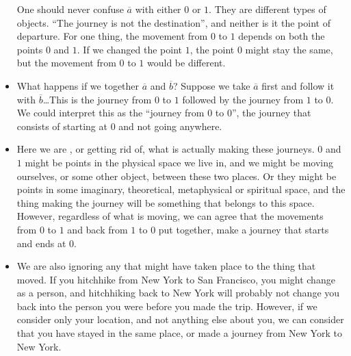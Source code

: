\begin{itemize}
One should never confuse $\overline{a}$ with either $0$ or $1$. They are different types of objects. ``The journey is not the destination'', and neither is it the point of departure. For one thing, the movement from $0$ to $1$ depends on both the points $0$ and $1$. If we changed the point $1$, the point $0$ might stay the same, but the movement from $0$ to $1$ would be different.
\item
What happens if we  together $\overline{a}$ and $\overline{b}$? Suppose we take $\overline{a}$ first and follow it with $\overline{b}$\ldots This is the journey from $0$ to $1$ followed by the journey from $1$ to $0$. We could interpret this as the ``journey from $0$ to $0$'', the journey that consists of starting at $0$ and not going anywhere.
\item
Here we are , or getting rid of, what is actually making these journeys. $0$ and $1$ might be points in the physical space we live in, and we might be moving ourselves, or some other object, between these two places. Or they might be points in some imaginary, theoretical, metaphysical or spiritual space, and the thing making the journey will be something that belongs to this space. However, regardless of what is moving, we can agree that the movements from $0$ to $1$ and back from $1$ to $0$ put together, make a journey that starts and ends at $0$. 
\item
We are also ignoring any  that might have taken place to the thing that moved. If you hitchhike from New York to San Francisco, you might change as a person, and hitchhiking back to New York will probably not change you back into the person you were before you made the trip. However, if we consider only your location, and not anything else about you, we can consider that you have stayed in the same place, or made a journey from New York to New York.


\end{itemize}
